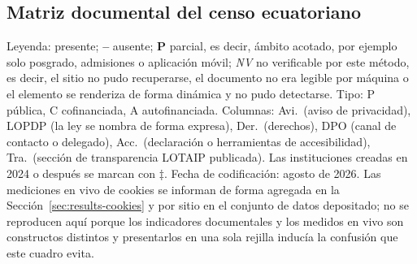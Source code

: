 \documentclass[pdflatex,sn-basic,Numbered]{sn-jnl}
\newcommand{\si}{\ding{51}}
\newcommand{\no}{\textcolor{gris}{\textbf{--}}}
\newcommand{\nv}{\textsl{\footnotesize NV}}
\theoremstyle{thmstyleone}
\theoremstyle{thmstyletwo}
\theoremstyle{thmstylethree}
\begin{document}
\begin{appendices}
\section{Matriz documental del censo ecuatoriano}\label{ap:ecuador}
\setcounter{table}{0}\setcounter{figure}{0}

Leyenda: \si{} presente; \no{} ausente; \textbf{P} parcial, es decir, \'ambito acotado, por ejemplo solo posgrado, admisiones o aplicaci\'on m\'ovil; \nv{} no verificable por este m\'etodo, es decir, el sitio no pudo recuperarse, el documento no era legible por m\'aquina o el elemento se renderiza de forma din\'amica y no pudo detectarse. Tipo: P p\'ublica, C cofinanciada, A autofinanciada. Columnas: Avi.\ (aviso de privacidad), LOPDP (la ley se nombra de forma expresa), Der.\ (derechos), DPO (canal de contacto o delegado), Acc.\ (declaraci\'on o herramientas de accesibilidad), Tra.\ (secci\'on de transparencia LOTAIP publicada). Las instituciones creadas en 2024 o despu\'es se marcan con $\ddagger$. Fecha de codificaci\'on: agosto de 2026. Las mediciones en vivo de cookies se informan de forma agregada en la Secci\'on~\ref{sec:results-cookies} y por sitio en el conjunto de datos depositado; no se reproducen aqu\'i porque los indicadores documentales y los medidos en vivo son constructos distintos y presentarlos en una sola rejilla induc\'ia la confusi\'on que este cuadro evita.


\end{appendices}
\end{document}
